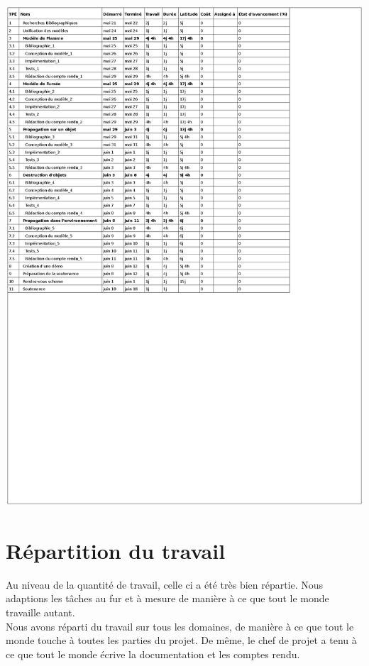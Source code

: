 \documentclass[a4paper,10pt]{article}
\begin{document}
        \includegraphics[scale=0.8]{../Planning/Planning.ps}


\section{Répartition du travail}
Au niveau de la quantité de travail, celle ci a été très bien répartie. Nous
adaptions les tâches au fur et à mesure de manière à ce que tout le monde travaille
autant. \\
Nous avons réparti du travail sur tous les domaines, de manière à ce que tout le monde
touche à toutes les parties du projet. De même, le chef de projet a tenu à ce que 
tout le monde écrive la documentation et les comptes rendu.\\
\end{document}
